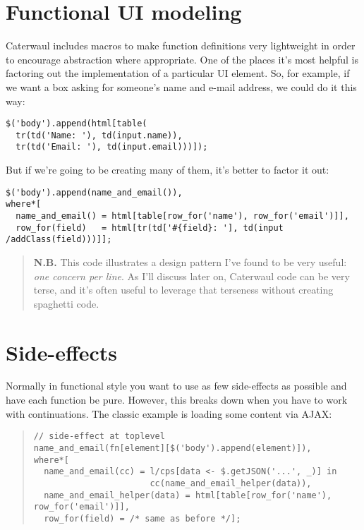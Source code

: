 \documentclass{report}
\begin{document}
\section{Functional UI modeling}
    Caterwaul includes macros to make function definitions very lightweight in order to encourage abstraction where appropriate. One of the places it's most helpful is factoring out the
    implementation of a particular UI element. So, for example, if we want a box asking for someone's name and e-mail address, we could do it this way:

\begin{verbatim}
$('body').append(html[table(
  tr(td('Name: '), td(input.name)),
  tr(td('Email: '), td(input.email)))]);
\end{verbatim}

    \noindent But if we're going to be creating many of them, it's better to factor it out:

\begin{verbatim}
$('body').append(name_and_email()),
where*[
  name_and_email() = html[table[row_for('name'), row_for('email')]],
  row_for(field)   = html[tr(td['#{field}: '], td(input /addClass(field)))]];
\end{verbatim}

\begin{quote}
\textbf{N.B.}
This code illustrates a design pattern I've found to be very useful: {\it one concern per line}. As I'll discuss later on, Caterwaul code can be very terse, and it's often useful to
leverage that terseness without creating spaghetti code.
\end{quote}
    
\section{Side-effects}
    Normally in functional style you want to use as few side-effects as possible and have each function be pure. However, this breaks down when you have to work with continuations. The classic
    example is loading some content via AJAX:

\begin{quote}
\begin{verbatim}
// side-effect at toplevel
name_and_email(fn[element][$('body').append(element)]),
where*[
  name_and_email(cc) = l/cps[data <- $.getJSON('...', _)] in
                       cc(name_and_email_helper(data)),
  name_and_email_helper(data) = html[table[row_for('name'), row_for('email')]],
  row_for(field) = /* same as before */];
\end{verbatim}
\end{quote}
\end{document}

